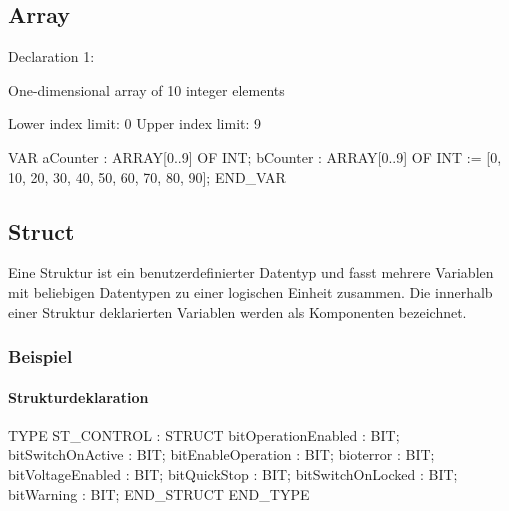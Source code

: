 \documentclass[
  10pt,
  a4paper,
]{article}
\let\oldparagraph\paragraph
\renewcommand{\paragraph}[1]{\oldparagraph{#1}\mbox{}}
\newenvironment{Shaded}{}{}
\newcommand{\NormalTok}[1]{\textcolor[rgb]{0.14,0.16,0.18}{#1}}
\numberwithin{equation}{section}
\let\paragraph\oldparagraph
\renewcommand{\paragraph}[1]{\oldparagraph{#1}\mbox{}\par}
\begin{document}
\hypertarget{array}{%
\subsection{Array}\label{array}}

Declaration 1:

One-dimensional array of 10 integer elements

Lower index limit: 0 Upper index limit: 9

\begin{Shaded}
\begin{Highlighting}[]
\NormalTok{VAR}
\NormalTok{    aCounter : ARRAY[0..9] OF INT;}
\NormalTok{    bCounter : ARRAY[0..9] OF INT := [0, 10, 20, 30, 40, 50, 60, 70, 80, 90];}
\NormalTok{END\_VAR}
\end{Highlighting}
\end{Shaded}

\hypertarget{struct}{%
\subsection{Struct}\label{struct}}

Eine Struktur ist ein benutzerdefinierter Datentyp und fasst mehrere
Variablen mit beliebigen Datentypen zu einer logischen Einheit zusammen.
Die innerhalb einer Struktur deklarierten Variablen werden als
Komponenten bezeichnet.

\hypertarget{beispiel}{%
\subsubsection{Beispiel}\label{beispiel}}

\hypertarget{strukturdeklaration}{%
\paragraph{Strukturdeklaration}\label{strukturdeklaration}}

\begin{Shaded}
\begin{Highlighting}[]
\NormalTok{TYPE ST\_CONTROL :}
\NormalTok{STRUCT}
\NormalTok{    bitOperationEnabled  : BIT;}
\NormalTok{    bitSwitchOnActive    : BIT;}
\NormalTok{    bitEnableOperation   : BIT;}
\NormalTok{    bioterror            : BIT;}
\NormalTok{    bitVoltageEnabled    : BIT;}
\NormalTok{    bitQuickStop         : BIT;}
\NormalTok{    bitSwitchOnLocked    : BIT;}
\NormalTok{    bitWarning           : BIT;}
\NormalTok{END\_STRUCT}
\NormalTok{END\_TYPE}
\end{Highlighting}
\end{Shaded}
\end{document}
